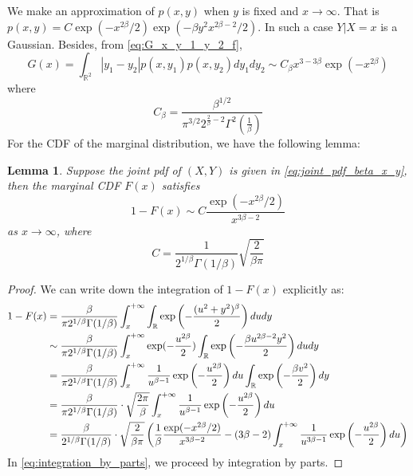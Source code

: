 \documentclass{article}
\newtheorem{lemma}{Lemma}
\def\R{\mathbb{R}}
\begin{document}
We make an approximation of $p(x,y)$ when $y$ is fixed and $x\to \infty$.
That is
$p(x,y)=C \exp(-x^{2\beta}/2) \exp(-\beta y^2 x^{2\beta-2}/2)$.
In such a case $Y|X=x$ is a Gaussian.
Besides, from \eqref{eq:G_x_y_1_y_2_f},
$$
G(x) = \int_{\R^2}
|y_1 - y_2| p(x,y_1)p(x,y_2)dy_1dy_2
\sim C_{\beta} x^{3-3\beta} \exp(-x^{2\beta})
$$
where
$$
C_{\beta}
= \frac{\beta^{1/2}}{\pi^{3/2} 2^{\frac{2}{\beta}-2}
\Gamma^2(\frac{1}{\beta})}
$$
For the CDF of the marginal distribution,
we have the following lemma:
\begin{lemma}\label{lem:phi_asymptotic}
    Suppose the joint pdf of $(X,Y)$
    is given in \eqref{eq:joint_pdf_beta_x_y}, then
    the marginal CDF $F(x)$ satisfies
$$
1-F(x) \sim C\frac{\exp(-x^{2\beta}/2)}{x^{3\beta - 2}}
$$ as $x\to \infty$,
where
$$
C=\frac{1}{2^{1/\beta} \Gamma(1/\beta)} \sqrt{\frac{2}{\beta \pi}
}$$
\end{lemma}
\begin{proof}
    We can write down the integration
    of $1-F(x)$
    explicitly as:
    \begin{align}
    1-F(x)  & = \frac{\beta}{\pi 2^{1/\beta} \Gamma(1/\beta)}
    \int_x^{+\infty}   \int_{\R} \exp \left(
        -\frac{(u^2+y^2)^{\beta}}{2}\right)
        dudy \notag \\
        & \sim \frac{\beta}{\pi 2^{1/\beta} \Gamma(1/\beta)}
        \int_x^{+\infty}  \exp(-\frac{u^{2\beta}}{2})
        \int_{\R} \exp \left(
            -\frac{\beta u^{2\beta - 2} y^2 }
            {2}
            \right)
            dudy\notag \\
        & = \frac{\beta}{\pi 2^{1/\beta} \Gamma(1/\beta)}
        \int_x^{+\infty} \frac{1}{u^{\beta-1}}
        \exp
        \left(
            -\frac{u^{2\beta}}{2}
        \right)du
        \int_{\R} \exp \left(
            -\frac{\beta v^2}{2}\right)
            dy \notag\\
        & = \frac{\beta}{\pi 2^{1/\beta} \Gamma(1/\beta)}
        \cdot \sqrt{\frac{2\pi}{\beta}}
        \int_x^{+\infty} \frac{1}{u^{\beta-1}}
        \exp
        \left(
            -\frac{u^{2\beta}}{2}
        \right)du
        \label{eq:integration_by_parts} \\
        &
        = \frac{\beta}{ 2^{1/\beta} \Gamma(1/\beta)}
        \cdot \sqrt{\frac{2}{\beta \pi}}
        \left(\frac{1}{\beta}
        \frac{\exp(-x^{2\beta}/2)}{x^{3\beta -2}}
        -(3\beta-2)
        \int_x^{+\infty} \frac{1}{u^{3\beta-1}}
        \exp
        \left( 
            -\frac{u^{2\beta}}{2}
        \right)du \right)\notag
    \end{align}
    In \eqref{eq:integration_by_parts},
    we proceed by integration by parts.

\end{proof}
\end{document}
